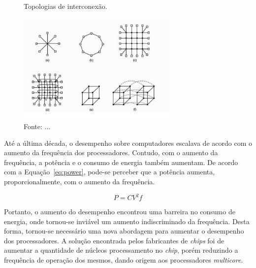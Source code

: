 


\begin{figure}[t]
	\centering
        \caption{Topologias de interconexão.}
	\includegraphics[width=0.7\textwidth]{figs/topologia.pdf}
    \caption*{Fonte: ...}
	\label{fig:mppa}
\end{figure}



Até a última década, o desempenho sobre computadores escalava de acordo com o
aumento da frequência dos processadores. Contudo, com o aumento da frequência,
a potência e o consumo de energia também aumentam. De acordo com a
Equação~\eqref{eq:power}, pode-se perceber que a potência aumenta,
proporcionalmente, com o aumento da frequência.


\begin{equation}\label{eq:power}
	P = CV^2f
\end{equation}


Portanto, o aumento do desempenho encontrou uma barreira no consumo de energia, onde tornou-se inviável
um aumento indiscriminado da frequência. Desta forma, tornou-se necessário uma
nova abordagem para aumentar o desempenho dos processadores. A solução encontrada
pelos fabricantes de \textit{chips} foi de aumentar a quantidade de núcleos processamento no \textit{chip},
porém reduzindo a frequência de operação dos mesmos, dando origem aos processadores \textit{multicore}.


